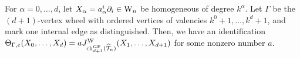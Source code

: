 \documentclass[10pt]{amsart}
\begin{document}
%
%

\begin{lem}
For $\alpha=0,\ldots,d$, let $X_\alpha = a^i_\alpha \partial_i \in {{\rm W}_n}$ be homogeneous of degree $k^\alpha$. 
Let $\Gamma$ be the $(d+1)$-vertex wheel with ordered vertices of valencies $k^0+1, \ldots, k^{d} + 1$, and mark one internal edge as distinguished.
Then, we have an identification $\Theta_{\Gamma,e}(X_0,\ldots,X_{d}) = a J^{\rm W}_{{\rm ch}_{d+1}^{\rm GF} (\widehat{\mathcal T}_n)}(X_1,\ldots,X_{d+1})$ for some nonzero number $a$. 
\end{lem}
 
\end{document}
